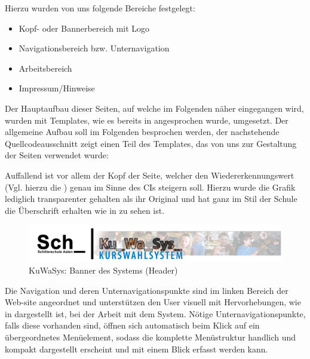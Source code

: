 Hierzu wurden von uns folgende Bereiche festgelegt:
\begin{itemize}
  \item Kopf- oder Bannerbereich mit Logo
  \item Navigationsbereich bzw. Unternavigation
  \item Arbeitsbereich
  \item Impressum/Hinweise
\end{itemize}

Der Hauptaufbau dieser Seiten, auf welche im Folgenden näher eingegangen wird, wurden mit Templates, wie es bereits in  angesprochen wurde, umgesetzt.
Der allgemeine Aufbau soll im Folgenden besprochen werden, der nachstehende Quellcodeausschnitt zeigt einen Teil des Templates, das von uns zur Gestaltung der Seiten verwendet wurde:

	

Auffallend ist vor allem der Kopf der Seite, welcher den Wiedererkennungswert (Vgl. hierzu die ) genau im Sinne des \ac{CI}s steigern soll.
Hierzu wurde die Grafik lediglich transparenter gehalten als ihr Original und hat ganz im Stil der Schule die Überschrift erhalten wie in  zu sehen ist.

\begin{figure}[H]
 \begin{center}
   \includegraphics[scale=0.4]{img/header_KuWaSys.png}
 \end{center}
 \caption[\textbf{KuWaSys: Banner des Systems (Header)}]{KuWaSys: Banner des Systems (Header)}
 \label{fig:header_KuWaSys}
\end{figure}

Die Navigation und deren Unternavigationspunkte sind im linken Bereich der Web-site angeordnet und unterstützen den User visuell mit Hervorhebungen, wie in  dargestellt ist, bei der Arbeit mit dem System.
Nötige Unternavigationspunkte, falls diese vorhanden sind, öffnen sich automatisch beim Klick auf ein übergeordnetes Menüelement, sodass die komplette Menüstruktur handlich und kompakt dargestellt erscheint und mit einem Blick erfasst werden kann.

